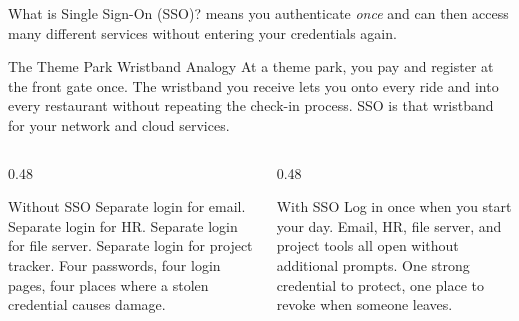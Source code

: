 \documentclass[aspectratio=169]{beamer}  %
\begin{document}
\begin{frame}{What is Single Sign-On (SSO)?}
    \footnotesize
     means you authenticate \emph{once} and can then access many different services without entering your credentials again.

    \vspace{0.4em}
    \begin{exampleblock}{The Theme Park Wristband Analogy}
        \footnotesize
        At a theme park, you pay and register at the front gate once. The wristband you receive lets you onto every ride and into every restaurant without repeating the check-in process. SSO is that wristband for your network and cloud services.
    \end{exampleblock}

    \vspace{0.3em}
    \begin{columns}[T]
        \begin{column}{0.48\textwidth}
            \begin{alertblock}{Without SSO}
                \footnotesize
                Separate login for email. Separate login for HR. Separate login for file server. Separate login for project tracker. Four passwords, four login pages, four places where a stolen credential causes damage.
            \end{alertblock}
        \end{column}
        \begin{column}{0.48\textwidth}
            \begin{block}{With SSO}
                \footnotesize
                Log in once when you start your day. Email, HR, file server, and project tools all open without additional prompts. One strong credential to protect, one place to revoke when someone leaves.
            \end{block}
        \end{column}
    \end{columns}
\end{frame}
\end{document}
